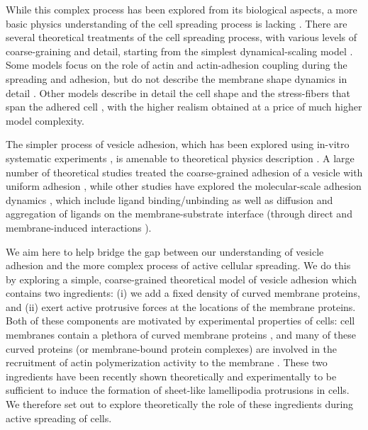 \documentclass[pre,amsmath]{revtex4}
\begin{document}
While this complex process has been explored from its biological aspects, a more basic physics understanding of the cell spreading process is lacking \cite{schwarz2013physics}. There are several theoretical treatments of the cell spreading process, with various levels of coarse-graining and detail, starting from the simplest dynamical-scaling model \cite{cuvelier2007universal}. Some models focus on the role of actin and actin-adhesion coupling during the spreading and adhesion, but do not describe the membrane shape dynamics in detail \cite{Sheetz2010,nisenholz2014active,gong2018matching,dedenon2019model}. Other models describe in detail the cell shape and the stress-fibers that span the adhered cell \cite{loosli2010cytoskeleton,fang2020active}, with the higher realism obtained at a price of much higher model complexity.

The simpler process of vesicle adhesion, which has been explored using in-vitro systematic experiments \cite{gruhn2007novel,reister2008dynamics,streicher2009integrin,maan2018adhesion,bibissidis2020}, is amenable to theoretical physics description \cite{bibissidis2020}. A large number of theoretical studies treated the coarse-grained adhesion of a vesicle with uniform adhesion \cite{lipowski1990,lipowsky1991,lipowski2005}, while other studies have explored the molecular-scale adhesion dynamics \cite{boulbitch2001kinetics,smith2008force,sengupta2018adhesion}, which include ligand binding/unbinding as well as diffusion and aggregation of ligands on the membrane-substrate interface (through direct and membrane-induced interactions \cite{farago2010fluctuation,fenz2017membrane}).

We aim here to help bridge the gap between our understanding of vesicle adhesion and the more complex process of active cellular spreading. We do this by exploring a simple, coarse-grained theoretical model of vesicle adhesion which contains two ingredients: (i) we add a fixed density of curved membrane proteins, and (ii) exert active protrusive forces at the locations of the membrane proteins. Both of these components are motivated by experimental properties of cells: cell membranes contain a plethora of curved membrane proteins \cite{zimmerberg2006proteins,suetsugu2014dynamic}, and many of these curved proteins (or membrane-bound protein complexes) are involved in the recruitment of actin polymerization activity to the membrane \cite{scita2008irsp53,kuhn2015structure}. These two ingredients have been recently shown theoretically \cite{miha2019} and experimentally \cite{begemann2019mechanochemical,graziano2019cell} to be sufficient to induce the formation of sheet-like lamellipodia protrusions in cells. We therefore set out to explore theoretically the role of these ingredients during active spreading of cells.
\end{document}
